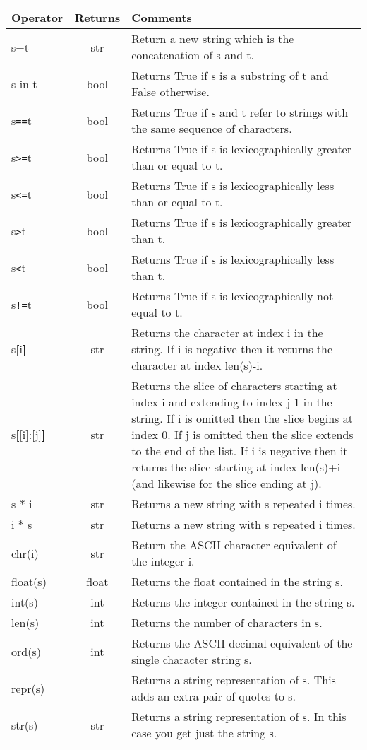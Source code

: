 \newlength{\commentwidth}
\setlength{\commentwidth}{2.2in}
\begin{center}
{\small
\begin{tabular}{|l|c|p{3in}|} \hline

{\bf Operator} & {\bf Returns} & {\bf Comments} \\ \hline\hline
s+t & str & 
Return a new string which is the  concatenation of s and t. \\ \hline
s in t  & bool &  Returns True if s is a substring of t and False otherwise.\\ \hline
s\verb+==+t  & bool &  
Returns True if s and t refer to strings with   the same sequence of characters.\\ \hline
s\verb+>=+t  & bool &  
Returns True if s is lexicographically greater  than or equal to t.\\ \hline
s\verb+<=+t  & bool &  
Returns True if s is lexicographically less  than or equal to t.\\ \hline
s\verb+>+t  & bool &  
Returns True if s is lexicographically greater  than t.\\ \hline
s\verb+<+t &bool & 
Returns True if s is lexicographically less  than t.\\ \hline
s\verb+!=+t &bool & 
Returns True if s is lexicographically not  equal to t.\\ \hline
s{\bf [}i{\bf ]}  & str &  
Returns the character at index i in the string.  If i is negative then it returns the character at  index len(s)-i.\\ \hline
s{\bf [}[i]:[j]{\bf ]} & str &
Returns the slice of characters starting at index i and extending to index j-1 in the  string. If i is omitted then the
slice begins at  index 0. If j is omitted then the slice extends  to the end of the list.  If i  is negative then it returns the slice starting at index len(s)+i (and likewise for the slice ending at j). 
\\ \hline
s $*$ i  & str & 
Returns a new string with s repeated i times.\\ \hline
i $*$ s  & str &  
Returns a new string with s repeated i times. \\ \hline
chr(i) & str & Return the ASCII character equivalent of the integer i. \\ \hline
float(s) & float & 
Returns the float contained in the string s. \\ \hline
int(s) & int &
Returns the integer contained in the string s. \\ \hline
len(s)  & int &  
Returns the number of characters in s.
\\ \hline
ord(s) & int & Returns the ASCII decimal equivalent of the single character string s. \\ \hline
repr(s)  &  &  
Returns a string representation of s. This adds an extra pair of quotes to s.\\ \hline
str(s)  & str &  
Returns a string representation of s. In this case you get just the string s. \\ \hline
\end{tabular}}
\end{center}

